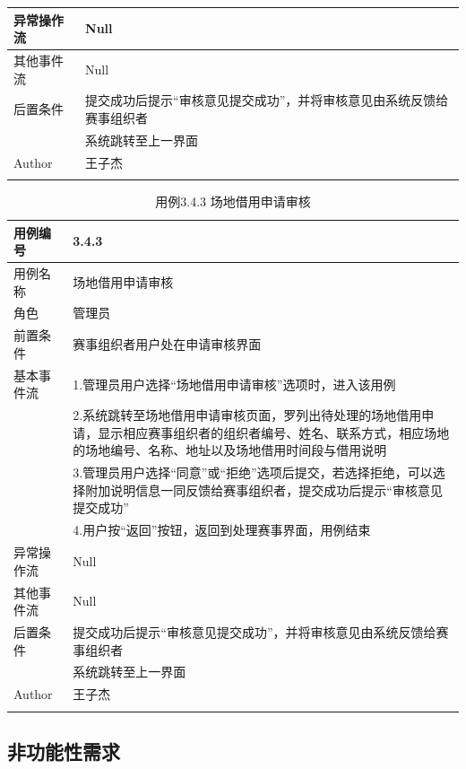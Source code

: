 \documentclass[a4paper,UTF8]{article}
\begin{document}
\begin{table}[H]
\begin{center}
\begin{tabular}{|p{}|p{}|}
			\hline
			异常操作流 & Null \\
			\hline
			其他事件流 & Null \\
			\hline
			后置条件 & 提交成功后提示“审核意见提交成功”，并将审核意见由系统反馈给赛事组织者\\& 系统跳转至上一界面 \\
			\hline
			Author & 王子杰 \\
			\noalign{\smallskip}
			\hline
			\noalign{\smallskip}
		\end{tabular}
	\end{center}
\end{table}

\begin{table}[H]
	\begin{center}
		\caption{用例3.4.3 场地借用申请审核}
		\label{table:Tab_uc343}
		\begin{tabular}{|p{}|p{}|}
			\hline\noalign{\smallskip}
			用例编号 & 3.4.3\\
			\hline
			用例名称 &  场地借用申请审核\\
			\hline
			角色 & 管理员\\
			\hline
			前置条件 & 赛事组织者用户处在申请审核界面 \\
			\hline
			基本事件流 & 1.管理员用户选择“场地借用申请审核”选项时，进入该用例 \\& 2.系统跳转至场地借用申请审核页面，罗列出待处理的场地借用申请，显示相应赛事组织者的组织者编号、姓名、联系方式，相应场地的场地编号、名称、地址以及场地借用时间段与借用说明\\& 3.管理员用户选择“同意”或“拒绝”选项后提交，若选择拒绝，可以选择附加说明信息一同反馈给赛事组织者，提交成功后提示“审核意见提交成功” \\& 4.用户按“返回”按钮，返回到处理赛事界面，用例结束\\
			\hline
			异常操作流 & Null \\
			\hline
			其他事件流 & Null \\
			\hline
			后置条件 & 提交成功后提示“审核意见提交成功”，并将审核意见由系统反馈给赛事组织者\\& 系统跳转至上一界面 \\
			\hline
			Author & 王子杰 \\
			\noalign{\smallskip}
			\hline
			\noalign{\smallskip}
		\end{tabular}
	\end{center}
\end{table}


\subsection{非功能性需求}
\end{document}
